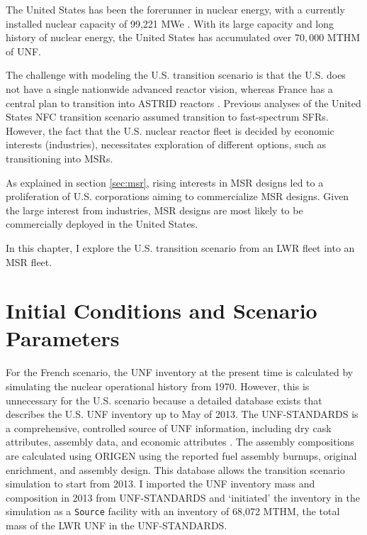 The United States has been the forerunner in nuclear energy, with a currently 
installed nuclear capacity of 99,221 \gls{MWe} \cite{iaea_nuclear_2017}.
With its large capacity and long history of nuclear
energy, the United States has accumulated over $70,000$ \gls{MTHM} of \gls{UNF}.

The challenge with modeling the U.S. transition scenario is that the U.S. does not have
a single nationwide advanced reactor vision, whereas France has a central plan to transition into \gls{ASTRID} reactors \cite{boullis_french_2015, varaine_pre-conceptual_2012}.
Previous analyses of the United States \cite{worrall_utilization_2013, sunny_transition_2015}
 \gls{NFC} transition scenario
assumed transition to fast-spectrum \glspl{SFR}.
However, the fact that the U.S. nuclear reactor fleet
is decided by economic interests (industries), necessitates
exploration of different options, such as transitioning into \glspl{MSR}.

As explained in section \ref{sec:msr}, rising interests in \gls{MSR} designs
led to a proliferation of U.S. corporations aiming to commercialize
\gls{MSR} designs. Given the large interest from industries,
\gls{MSR} designs are
most likely to be commercially deployed in the United States.

In this chapter, I explore the U.S. transition scenario
from an \gls{LWR} fleet into an \gls{MSR} fleet.

\section{Initial Conditions and Scenario Parameters}

For the French scenario, the \gls{UNF} inventory at the present
time is calculated by simulating the nuclear operational history from 1970.
However, this is unnecessary for the U.S. scenario because a detailed
database exists that describes the U.S. \gls{UNF} inventory up to May of 2013.
The \gls{UNF-STANDARDS} is a comprehensive,
controlled source of \gls{UNF} information, including dry cask attributes, assembly
data, and economic attributes \cite{peterson_unf-st&dards_2017}. The assembly
compositions are calculated using ORIGEN \cite{parks_overview_1992} using the
reported fuel assembly burnups, original enrichment, and assembly design. This database
allows the transition scenario simulation to start from 2013. I imported 
the \gls{UNF} inventory mass and composition in 2013
from \gls{UNF-STANDARDS} and `initiated' the inventory in the simulation
as a \texttt{Source} facility with an inventory of 68,072 MTHM,
the total mass of the \gls{LWR} \gls{UNF} in the \gls{UNF-STANDARDS}.

